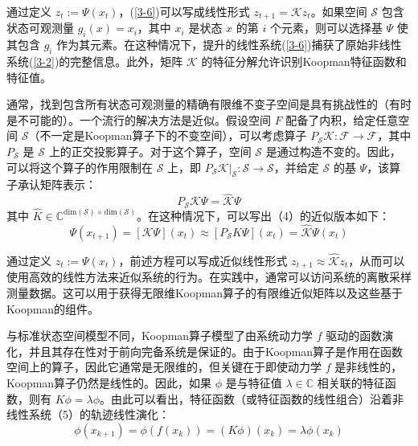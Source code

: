 \documentclass[lang=chs, degree=master, blindreview=false, winfonts=true]{yanputhesis}
\begin{document}
通过定义 \( z_t := \Psi(x_t) \)，(\ref{3-6})可以写成线性形式 \( z_{t+1} = \mathcal{K}z_t \)。如果空间 \( \mathcal{S} \) 包含状态可观测量 \( g_i(x) = x_i \)，其中 \( x_i \) 是状态 \( x \) 的第 \( i \) 个元素，则可以选择基 \( \Psi \) 使其包含 \( g_i \) 作为其元素。在这种情况下，提升的线性系统(\ref{3-6})捕获了原始非线性系统(\ref{3-2})的完整信息。此外，矩阵 \( \mathcal{K} \) 的特征分解允许识别Koopman特征函数和特征值。

通常，找到包含所有状态可观测量的精确有限维不变子空间是具有挑战性的（有时是不可能的）。一个流行的解决方法是近似。假设空间 \( F \) 配备了内积，给定任意空间 \( \mathcal{S} \)（不一定是Koopman算子下的不变空间），可以考虑算子 \( P_\mathcal{S} \mathcal{K}: \mathcal{F} \to \mathcal{F} \)，其中 \( P_\mathcal{S} \) 是 \( \mathcal{S} \) 上的正交投影算子。对于这个算子，空间 \( \mathcal{S} \) 是通过构造不变的。因此，可以将这个算子的作用限制在 \( \mathcal{S} \) 上，即 \( P_\mathcal{S} \mathcal{K} \rvert_\mathcal{S}: \mathcal{S} \to \mathcal{S} \)，并给定 \( \mathcal{S} \) 的基 \( \Psi \)，该算子承认矩阵表示：
\begin{equation}
	P_\mathcal{S} \mathcal{K}\Psi = \hat{\mathcal{K}}\Psi
	\label{3-7}
\end{equation}
其中 \( \hat{K} \in \mathbb{C}^{\text{dim}(\mathcal{S}) \times \text{dim}(\mathcal{S})} \)。在这种情况下，可以写出（4）的近似版本如下：
\begin{equation}
	\Psi(x_{t+1}) = [\mathcal{K}\Psi](x_t) \approx [P_\mathcal{S} K\Psi](x_t) = \hat{\mathcal{K}}\Psi(x_t)
	\label{3-8}
\end{equation}

通过定义 \( z_t := \Psi(x_t) \)，前述方程可以写成近似线性形式 \( z_{t+1} \approx \hat{\mathcal{K}}z_t \)，从而可以使用高效的线性方法来近似系统的行为。在实践中，通常可以访问系统的离散采样测量数据。这可以用于获得无限维Koopman算子的有限维近似矩阵以及这些基于Koopman的组件。

与标准状态空间模型不同，Koopman算子模型了由系统动力学 \( f \) 驱动的函数演化，并且其存在性对于前向完备系统是保证的。由于Koopman算子是作用在函数空间上的算子，因此它通常是无限维的，但关键在于即使动力学 \( f \) 是非线性的，Koopman算子仍然是线性的。因此，如果 \( \phi \) 是与特征值 \( \lambda \in \mathbb{C} \) 相关联的特征函数，则有 \( K\phi = \lambda\phi \)。由此可以看出，特征函数（或特征函数的线性组合）沿着非线性系统（5）的轨迹线性演化：
\begin{equation}
	\phi(x_{k+1}) = \phi(f(x_k)) = (K\phi)(x_k) = \lambda\phi(x_k)
\end{equation}
\end{document}
